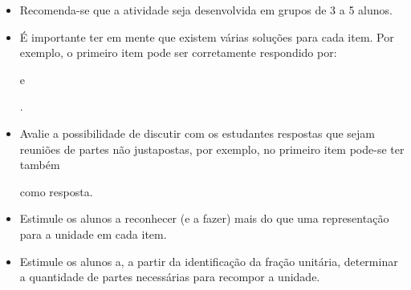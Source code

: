  \vspace{.1cm}

   \vspace{.1cm}

  \begin{itemize} %
    \item       Recomenda-se que a atividade seja desenvolvida em grupos de 3 a 5 alunos.
    \item       É importante ter em mente que existem várias soluções para cada item. Por exemplo, o primeiro item pode ser corretamente respondido por:             
 e
 .
    \item       Avalie a possibilidade de discutir com os estudantes respostas que sejam reuniões de partes não justapostas, por exemplo, no primeiro item pode-se ter também             
      como resposta.
    \item       Estimule os alunos a reconhecer (e a fazer) mais do que uma representação para a unidade em cada item.
    \item       Estimule os alunos a, a partir da identificação da fração unitária, determinar a quantidade de partes necessárias para recompor a unidade.
\end{itemize} %

